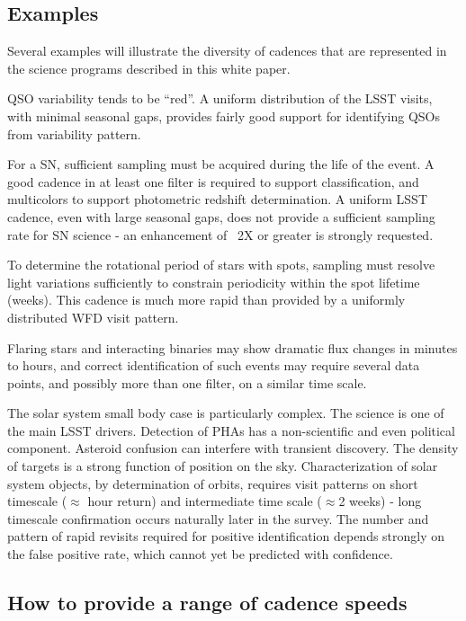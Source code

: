 \subsection{Examples}

Several examples will illustrate the diversity of cadences that are
represented in the science programs described in this white paper.

QSO variability tends to be ``red''.   A uniform distribution of the
LSST visits, with minimal seasonal gaps, provides fairly good support
for identifying QSOs from variability pattern.

For a SN, sufficient sampling must be acquired during the life of the
event. A good cadence in at least one filter is required to support
classification, and multicolors to support photometric redshift
determination.  A uniform LSST  cadence, even with large seasonal gaps,
does not provide a sufficient sampling rate for SN science - an
enhancement of ~2X or greater is strongly requested.

To determine the rotational period of stars with spots, sampling must
resolve light variations sufficiently to constrain periodicity within
the spot lifetime (weeks). This cadence is much more rapid than provided
by a uniformly distributed WFD visit pattern.

Flaring stars and interacting binaries  may show dramatic flux changes
in minutes to hours, and correct identification of such events may
require several data points, and possibly more than one filter, on a
similar time scale.

The solar system small body case is particularly complex.  The science
is one of the main LSST drivers.  Detection of PHAs has a non-scientific
and even political component. Asteroid confusion can interfere with
transient discovery. The density of targets is a strong function of
position on the sky.  Characterization of solar system objects, by
determination of orbits, requires visit patterns on short timescale
($\approx$ hour return) and intermediate time scale ($\approx$2 weeks) -
long timescale confirmation occurs naturally later in the survey.  The
number and pattern of rapid revisits required for positive
identification depends strongly on the false positive rate, which cannot
yet be predicted with confidence.

\subsection{How to provide a range of cadence speeds}

